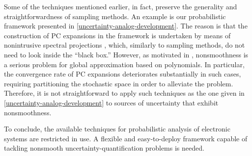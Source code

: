 Some of the techniques mentioned earlier, in fact, preserve the generality and
straightforwardness of sampling methods. An example is our probabilistic
framework presented in \cref{uncertainty-analog-development}. The reason is that
the construction of \ac{PC} expansions in the framework is undertaken by means
of nonintrusive spectral projections \cite{xiu2010}, which, similarly to
sampling methods, do not need to look inside the ``black box.'' However, as
motivated in , nonsmoothness is a serious problem for
global approximation based on polynomials. In particular, the convergence rate
of \ac{PC} expansions deteriorates substantially in such cases, requiring
partitioning the stochastic space in order to alleviate the problem. Therefore,
it is not straightforward to apply such techniques as the one given in
\cref{uncertainty-analog-development} to sources of uncertainty that exhibit
nonsmoothness.

To conclude, the available techniques for probabilistic analysis of electronic
systems are restricted in use. A flexible and easy-to-deploy framework capable
of tackling nonsmooth uncertainty-quantification problems is needed.
